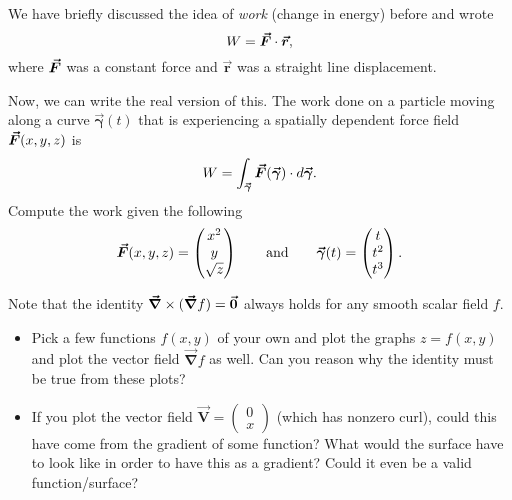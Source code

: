 \documentclass[12pt]{article} %
\newcommand{\vecfieldV}{\boldsymbol{\vec{V}}}
\newcommand{\curvegamma}{\boldsymbol{\vec{\gamma}}}
\newcommand{\grad}{\boldsymbol{\vec{\nabla}}}
\newcommand{\rvec}{\boldsymbol{\vec{r}}}
\begin{document}
\begin{problem} 
We have briefly discussed the idea of \emph{work} (change in energy) before and wrote
\[
W = \forcevec \cdot \rvec,
\]
where $\boldsymbol{\vec{F}}$ was a constant force and $\rvec$ was a straight line displacement.

Now, we can write the real version of this. The work done on a particle moving along a curve $\curvegamma(t)$ that is experiencing a spatially dependent force field $\boldsymbol{\vec{F}}(x,y,z)$ is
\[
W = \int_{\curvegamma} \forcevec(\curvegamma) \cdot d\curvegamma.
\]
Compute the work given the following
\[
\forcevec(x,y,z) = \begin{pmatrix} x^2 \\ y \\ \sqrt{z} \end{pmatrix} \qquad \textrm{and} \qquad \curvegamma(t) = \begin{pmatrix} t \\ t^2 \\ t^3 \end{pmatrix}.
\]
\end{problem}



\begin{problem}
    Note that the identity $\grad \times (\grad f)=\zerovec$ always holds for any smooth scalar field $f$. 
    \begin{itemize}
        \item Pick a few functions $f(x,y)$ of your own and plot the graphs $z=f(x,y)$ and plot the vector field $\grad f$ as well.  Can you reason why the identity must be true from these plots? 
        \item If you plot the vector field $\vecfieldV = \begin{pmatrix} 0 \\ x \end{pmatrix}$ (which has nonzero curl), could this have come from the gradient of some function? What would the surface have to look like in order to have this as a gradient? Could it even be a valid function/surface?
    \end{itemize}
\end{problem}
\end{document}

